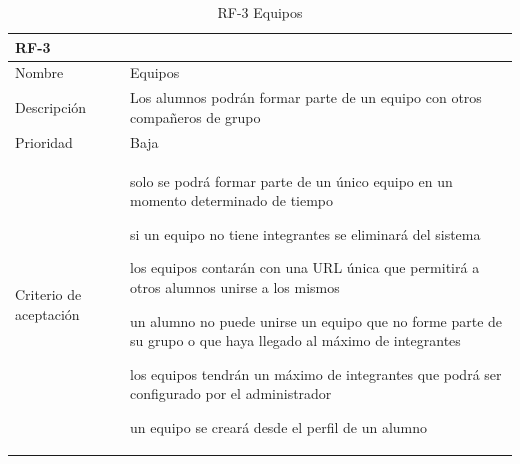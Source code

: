 \documentclass[11pt,spanish,listoffigures,listoftables]{tfgetsinf}
\begin{document}
\begin{table}[!ht]
	\centering
	\begin{tabular}{ |p{4cm}||p{10cm}|  }
		\multicolumn{2}{l}{\textbf{RF-3}} \\
		\hline
		Nombre & Equipos\\
		\hline
		Descripción & Los \gls{alumno}s podrán formar parte de un \gls{equipo} con otros compañeros de \gls{grupo}  \\
		\hline
		Prioridad & Baja\\
		\hline
		Criterio de aceptación & 
		\begin{tabitem}
			\item solo se podrá formar parte de un único \gls{equipo} en un momento determinado de tiempo
			\item si un \gls{equipo} no tiene integrantes se eliminará del sistema
			\item los \gls{equipo}s contarán con una URL única que permitirá a otros \gls{alumno}s unirse a los mismos
			\item un \gls{alumno} no puede unirse un \gls{equipo} que no forme parte de su \gls{grupo} o que haya llegado al máximo de integrantes
			\item los \gls{equipo}s tendrán un máximo de integrantes que podrá ser configurado por el \gls{administrador}
			\item un \gls{equipo} se creará desde el perfil de un \gls{alumno}
		\end{tabitem} \\
		\hline
	\end{tabular}
	\caption{RF-3 Equipos}
	\label{table:3}
\end{table}
\end{document}
